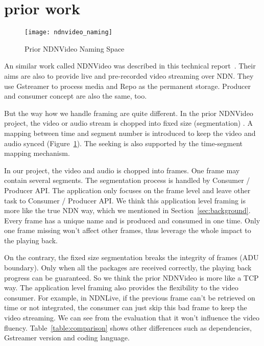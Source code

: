 \section{prior work} %
\label{sec:comparison}
\begin{figure}%
  \centering
  \texttt{[image: ndnvideo\_naming]}
  \caption{Prior NDNVideo Naming Space}
  \label{fig:ndnvideo_naming}
\end{figure}
An similar work called NDNVideo was described in this technical report~\cite{ndnvideo}. Their aims are also to provide live and pre-recorded video streaming over NDN. They use Gstreamer to process media and Repo as the permanent storage. Producer and consumer concept are also the same, too. 

But the way how we handle framing are quite different. In the prior NDNVideo project, the video or audio stream is chopped into fixed size (segmentation) . A mapping between time and segment number is introduced to keep the video and audio synced (Figure~\ref{fig:ndnvideo_naming}). The seeking is also supported by the time-segment mapping mechanism. 

In our project, the video and audio is chopped into frames. One frame may contain several segments. The segmentation process is handled by Consumer / Producer API. The application only focuses on the frame level and leave other task to Consumer / Producer API. We think this application level framing is more like the true NDN way, which we mentioned in Section~\ref{sec:background}. Every frame has a unique name and is produced and consumed in one time. Only one frame missing won't affect other frames, thus leverage the whole impact to the playing back. 

On the contrary, the fixed size segmentation breaks the integrity of frames (ADU boundary). Only when all the packages are received correctly, the playing back progress can be guaranteed. So we think the prior NDNVideo is more like a TCP way. The application level framing also provides the flexibility to the video consumer. For example, in NDNLive, if the previous frame can't be retrieved on time or not integrated, the consumer can just skip this bad frame to keep the video streaming. We can see from the evaluation that it won't influence the video fluency. Table~\ref{table:comparison} shows other differences such as dependencies, Gstreamer version and coding language.

